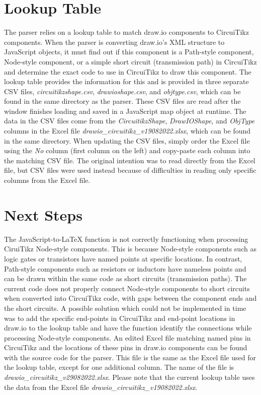 \section{Lookup Table}\label{sec:parser-lookup-table}
The parser relies on a lookup table to match draw.io components to CircuiTikz components.
When the parser is converting draw.io's XML structure to JavaScript objects, it must find out if this component is a Path-style component, Node-style component, or a simple short circuit (transmission path) in CircuiTikz and determine the exact code to use in CircuiTikz to draw this component.
The lookup table provides the information for this and is provided in three separate CSV files, \emph{circuitikzshape.csv}, \emph{drawioshape.csv}, and \emph{objtype.csv}, which can be found in the same directory as the parser.
These CSV files are read after the window finishes loading and saved in a JavaScript map object at runtime.
The data in the CSV files come from the \emph{CircuitikzShape}, \emph{DrawIOShape}, and \emph{ObjType} columns in the Excel file \emph{drawio\_circuitikz\_v19082022.xlsx}, which can be found in the same directory.
When updating the CSV files, simply order the Excel file using the \emph{No} column (first column on the left) and copy-paste each column into the matching CSV file.
The original intention was to read directly from the Excel file, but CSV files were used instead because of difficulties in reading only specific columns from the Excel file.


\section{Next Steps}\label{sec:pick-up}
The JavaScript-to-LaTeX function is not correctly functioning when processing CiruiTikz Node-style components.
This is because Node-style components such as logic gates or transistors have named points at specific locations.
In contrast, Path-style components such as resistors or inductors have nameless points and can be drawn within the same code as short circuits (transmission paths).
The current code does not properly connect Node-style components to short circuits when converted into CircuiTikz code, with gaps between the component ends and the short circuits.
A possible solution which could not be implemented in time was to add the specific end-points in CircuiTikz and end-point locations in draw.io to the lookup table and have the function identify the connections while processing Node-style components.
An edited Excel file matching named pins in CircuiTikz and the locations of these pins in draw.io components can be found with the source code for the parser.
This file is the same as the Excel file used for the lookup table, except for one additional column.
The name of the file is \emph{drawio\_circuitikz\_v29082022.xlsx}.
Please note that the current lookup table uses the data from the Excel file \emph{drawio\_circuitikz\_v19082022.xlsx}.
